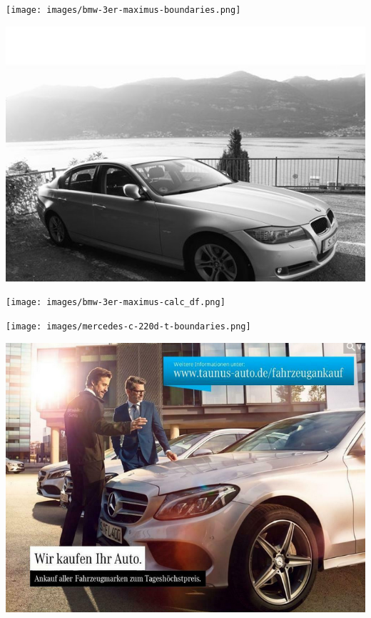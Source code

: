\documentclass[landscape, DIV=99]{scrartcl}
\begin{document}
\twocolumn
\null
\vfill 
\texttt{[image: images/bmw-3er-maximus-boundaries.png]}
\vfill 

\pagebreak

\null
\vfill 
\includegraphics[width=\columnwidth]{cars/bmw-3er-maximus.png}
\vfill 

\pagebreak

\onecolumn
\null
\vfill 
\begin{center}
\texttt{[image: images/bmw-3er-maximus-calc\_df.png]}
\end{center}
\vfill 
    
\twocolumn
\null
\vfill 
\texttt{[image: images/mercedes-c-220d-t-boundaries.png]}
\vfill 

\pagebreak

\null
\vfill 
\includegraphics[width=\columnwidth]{cars/mercedes-c-220d-t.png}
\vfill 
\end{document}
